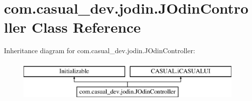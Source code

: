 \hypertarget{classcom_1_1casual__dev_1_1jodin_1_1_j_odin_controller}{\section{com.\-casual\-\_\-dev.\-jodin.\-J\-Odin\-Controller Class Reference}
\label{classcom_1_1casual__dev_1_1jodin_1_1_j_odin_controller}
}
Inheritance diagram for com.\-casual\-\_\-dev.\-jodin.\-J\-Odin\-Controller\-:\begin{figure}[H]
\begin{center}
\leavevmode
\includegraphics[height=2.000000cm]{classcom_1_1casual__dev_1_1jodin_1_1_j_odin_controller}
\end{center}
\end{figure}
